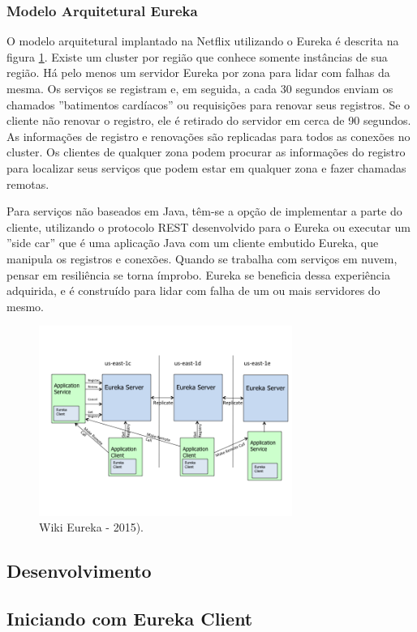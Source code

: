 \documentclass[journal]{IEEEtran}
\begin{document}
\subsubsection{Modelo Arquitetural Eureka}
O modelo arquitetural implantado na Netflix utilizando o Eureka é descrita na figura \ref{fig:wiki-eureka-est}. Existe um cluster por região que conhece somente instâncias de sua região. Há pelo menos um servidor Eureka por zona para lidar com falhas da mesma. Os serviços se registram e, em seguida, a cada 30 segundos enviam os chamados ''batimentos cardíacos'' ou requisições para renovar seus registros. Se o cliente não renovar o registro, ele é retirado do servidor em cerca de 90 segundos. As informações de registro e renovações são replicadas para todos as conexões no cluster. Os clientes de qualquer zona podem procurar as informações do registro para localizar seus serviços que podem estar em qualquer zona e fazer chamadas remotas.

Para serviços não baseados em Java, têm-se a opção de implementar a parte do cliente, utilizando o protocolo REST desenvolvido para o Eureka ou executar um ''side car'' que é uma aplicação Java com um cliente embutido Eureka, que manipula os registros e conexões. Quando se trabalha com serviços em nuvem, pensar em resiliência se torna ímprobo. Eureka se beneficia dessa experiência adquirida, e é construído para lidar com falha de um ou mais servidores do mesmo.

\begin{figure}[h]
\centering
\includegraphics[height=6.2cm]{figura6}
\caption{Wiki Eureka - 2015).}
\label{fig:wiki-eureka-est}
\end{figure}
 

\subsection{Desenvolvimento}

\subsection{Iniciando com Eureka Client}
\end{document}
